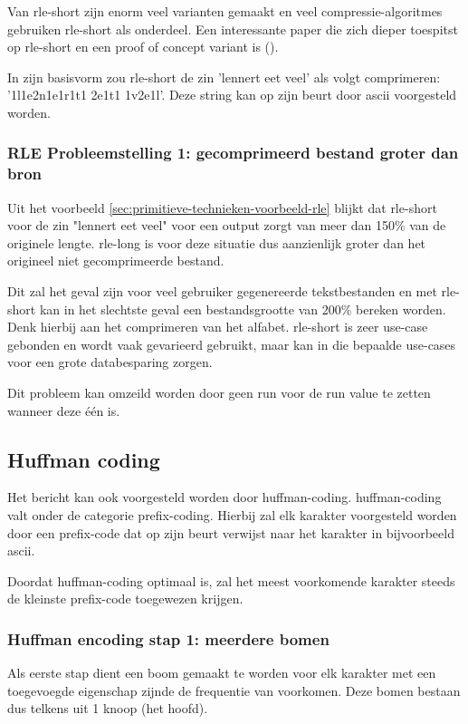 Van \gls{rle-short} zijn enorm veel varianten gemaakt en veel \glspl{compressie-algoritme} gebruiken \gls{rle-short} als onderdeel. Een interessante paper die zich dieper toespitst op \gls{rle-short} en een proof of concept variant is  (\cite{rleimproved}). 

In zijn basisvorm zou \gls{rle-short} de zin 'lennert eet veel' als volgt comprimeren: 
'1l1e2n1e1r1t1 2e1t1 1v2e1l'. Deze string kan op zijn beurt door \gls{ascii} voorgesteld worden.

\subsubsection{RLE Probleemstelling 1: gecomprimeerd bestand groter dan bron}
\label{sec:primitieve-technieken-voorbeeld-rle-probleem-1}
Uit het voorbeeld \ref{sec:primitieve-technieken-voorbeeld-rle} blijkt dat \gls{rle-short} voor de zin "lennert eet veel" voor een output zorgt van meer dan 150\% van de originele lengte. \Gls{rle-long} is voor deze situatie dus aanzienlijk groter dan het origineel niet gecomprimeerde bestand. 

Dit zal het geval zijn voor veel gebruiker gegenereerde tekstbestanden en met \gls{rle-short} kan in het slechtste geval een bestandsgrootte van 200\% bereken worden. Denk hierbij aan het comprimeren van het alfabet. \Gls{rle-short} is zeer \gls{use-case} gebonden en wordt vaak gevarieerd gebruikt, maar kan in die bepaalde \glspl{use-case} voor een grote databesparing zorgen.

Dit probleem kan omzeild worden door geen run voor de run value te zetten wanneer deze één is. 

\subsection{Huffman coding}
\label{sec:primitieve-technieken-voorbeeld-huffman-encoding}
Het bericht kan ook voorgesteld worden door \gls{huffman-coding}. \gls{huffman-coding} valt onder de categorie \gls{prefix-coding}. Hierbij zal elk karakter voorgesteld worden door een \gls{prefix-code} dat op zijn beurt verwijst naar het karakter in bijvoorbeeld \gls{ascii}. 

Doordat \gls{huffman-coding} optimaal is, zal het meest voorkomende karakter steeds de kleinste \gls{prefix-code} toegewezen krijgen.

\subsubsection{Huffman encoding stap 1: meerdere bomen}
\label{sec:primitieve-technieken-voorbeeld-huffman-encoding-1}
Als eerste stap dient een boom gemaakt te worden voor elk karakter met een toegevoegde eigenschap zijnde de frequentie van voorkomen. Deze bomen bestaan dus telkens uit 1 knoop (het hoofd).

